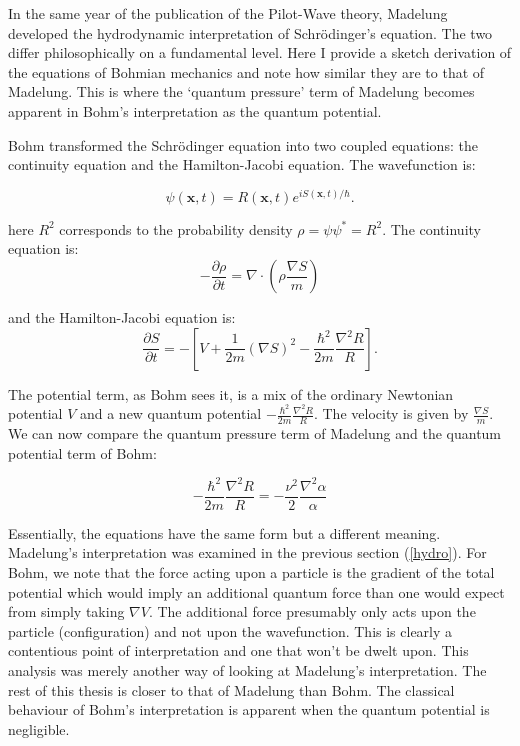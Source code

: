 In the same year of the publication of the Pilot-Wave theory, Madelung developed the hydrodynamic interpretation of Schr\"odinger's equation. The two differ philosophically on a fundamental level. Here I provide a sketch derivation of the equations of Bohmian mechanics and note how similar they are to that of Madelung. This is where the `quantum pressure' term of Madelung becomes apparent in Bohm's interpretation as the quantum potential.

Bohm transformed the Schr\"odinger equation into two coupled equations: the continuity equation and the Hamilton-Jacobi equation. The wavefunction is:

\begin{equation}
\psi(\mathbf{x},t) = R(\mathbf{x},t)e^{i S(\mathbf{x},t) / \hbar}. 
\end{equation}

\noindent here $R^2$ corresponds to the probability density $\rho = \psi\psi^* = R^2$. The continuity equation is:
\begin{equation}
 -\frac{\partial \rho}{\partial t} = \nabla \cdot \left(\rho \frac{\nabla S}{m}\right)
\end{equation}

\noindent and the Hamilton-Jacobi equation is: 
\begin{equation}
\frac{\partial S}{\partial t} = -\left[ V + \frac{1}{2m}(\nabla S)^2 -\frac{\hbar ^2}{2m} \frac{\nabla ^2R}{R} \right]. 
\end{equation}

\noindent The potential term, as Bohm sees it, is a mix of the ordinary Newtonian potential $V$ and a new quantum potential $-\frac{\hbar ^2}{2m} \frac{\nabla ^2 R}{R}$. The velocity is given by $\frac{\nabla S}{m}$. We can now compare the quantum pressure term of Madelung and the quantum potential term of Bohm:

\begin{equation}
-\frac{\hbar ^2}{2m} \frac{\nabla ^2R}{R} = -\frac{\nu^2}{2}\frac{\nabla ^2\alpha}{\alpha} 
\end{equation}

\noindent Essentially, the equations have the same form but a different meaning. Madelung's interpretation was examined in the previous section (\ref{hydro}). For Bohm, we note that the force acting upon a particle is the gradient of the total potential which would imply an additional quantum force than one would expect from simply taking $\nabla V$. The additional force presumably only acts upon the particle (configuration) and not upon the wavefunction. This is clearly a contentious point of interpretation and one that won't be dwelt upon. This analysis was merely another way of looking at Madelung's interpretation. The rest of this thesis is closer to that of Madelung than Bohm. The classical behaviour of Bohm's interpretation is apparent when the quantum potential is negligible.



